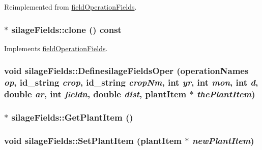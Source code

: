 Reimplemented from \hyperlink{classfield_operation_fields_aeb2bce9d4612033dbab366d870e432a6}{fieldOperationFields}.\hypertarget{classsilage_fields_a143ee0ad2ae333fe8f9b8b6c119bf46d}{
\subsubsection[{clone}]{ $\ast$ silageFields::clone () const}}
\label{classsilage_fields_a143ee0ad2ae333fe8f9b8b6c119bf46d}


Implements \hyperlink{classfield_operation_fields_ae5d8585b7e57196ce3801eed29677b3e}{fieldOperationFields}.\hypertarget{classsilage_fields_a51348396a66041b5d841d27fadac970e}{
\subsubsection[{DefinesilageFieldsOper}]{\setlength{\rightskip}{0pt plus 5cm}void silageFields::DefinesilageFieldsOper ({\bf operationNames} {\em op}, \/  {\bf id\_\-string} {\em crop}, \/  {\bf id\_\-string} {\em cropNm}, \/  int {\em yr}, \/  int {\em mon}, \/  int {\em d}, \/  double {\em ar}, \/  int {\em fieldn}, \/  double {\em dist}, \/  {\bf plantItem} $\ast$ {\em thePlantItem})}}
\label{classsilage_fields_a51348396a66041b5d841d27fadac970e}
\hypertarget{classsilage_fields_abf8908c6ba3f05c32dcfee9e7ff07c8a}{
\subsubsection[{GetPlantItem}]{$\ast$ silageFields::GetPlantItem ()}}
\label{classsilage_fields_abf8908c6ba3f05c32dcfee9e7ff07c8a}
\hypertarget{classsilage_fields_abdc01c52adbfc4947b8bc13550d55a1e}{
\subsubsection[{SetPlantItem}]{\setlength{\rightskip}{0pt plus 5cm}void silageFields::SetPlantItem ({\bf plantItem} $\ast$ {\em newPlantItem})}}
\label{classsilage_fields_abdc01c52adbfc4947b8bc13550d55a1e}


